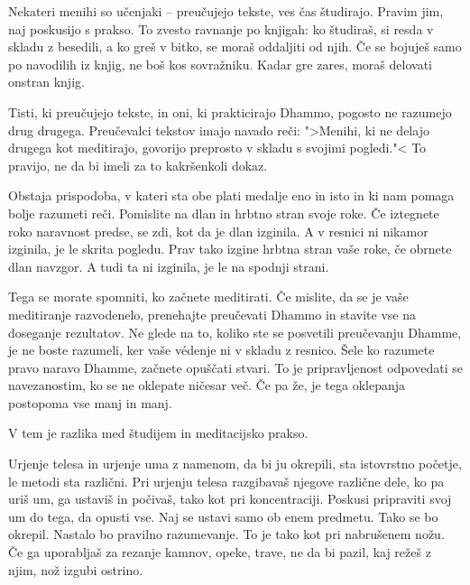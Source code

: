 \vspace{-\baselineskip}

Nekateri menihi so učenjaki – preučujejo tekste, ves čas študirajo. Pravim jim, naj poskusijo s prakso. To zvesto ravnanje po knjigah: ko študiraš, si resda v skladu z besedili, a ko greš v bitko, se moraš oddaljiti od njih. Če se bojuješ samo po navodilih iz knjig, ne boš kos sovražniku. Kadar gre zares, moraš delovati onstran knjig.

\clearpage


Tisti, ki preučujejo tekste, in oni, ki prakticirajo Dhammo, pogosto ne razumejo drug drugega. Preučevalci tekstov imajo navado reči: ">Menihi, ki ne delajo drugega kot meditirajo, govorijo preprosto v skladu s svojimi pogledi."< To pravijo, ne da bi imeli za to kakršenkoli dokaz.

Obstaja prispodoba, v kateri sta obe plati medalje eno in isto in ki nam pomaga bolje razumeti reči. Pomislite na dlan in hrbtno stran svoje roke. Če iztegnete roko naravnost predse, se zdi, kot da je dlan izginila. A v resnici ni nikamor izginila, je le skrita pogledu. Prav tako izgine hrbtna stran vaše roke, če obrnete dlan navzgor. A tudi ta ni izginila, je le na spodnji strani.

Tega se morate spomniti, ko začnete meditirati. Če mislite, da se je vaše meditiranje razvodenelo, prenehajte preučevati Dhammo in stavite vse na doseganje rezultatov. Ne glede na to, koliko ste se posvetili preučevanju Dhamme, je ne boste razumeli, ker vaše védenje ni v skladu z resnico. Šele ko razumete pravo naravo Dhamme, začnete opuščati stvari. To je pripravljenost odpovedati se navezanostim, ko se ne oklepate ničesar več. Če pa že, je tega oklepanja postopoma vse manj in manj.

V tem je razlika med študijem in meditacijsko prakso.

\clearpage


Urjenje telesa in urjenje uma z namenom, da bi ju okrepili, sta istovrstno početje, le metodi sta različni. Pri urjenju telesa razgibavaš njegove različne dele, ko pa uriš um, ga ustaviš in počivaš, tako kot pri koncentraciji. Poskusi pripraviti svoj um do tega, da opusti vse. Naj se ustavi samo ob enem predmetu. Tako se bo okrepil. Nastalo bo pravilno razumevanje. To je tako kot pri nabrušenem nožu. Če ga uporabljaš za rezanje kamnov, opeke, trave, ne da bi pazil, kaj režeš z njim, nož izgubi ostrino.

